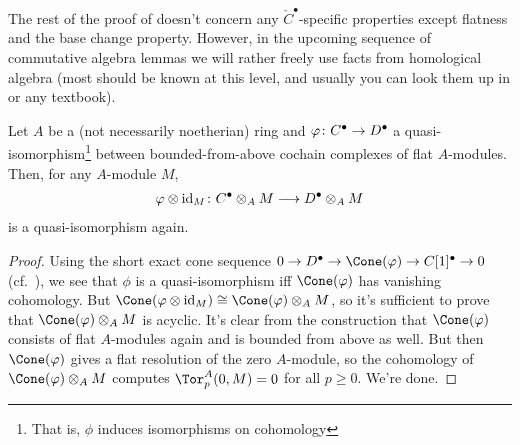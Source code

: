 \documentclass[a4paper,parskip=half,numbers=enddot, DIV=12]{scrreprt}
\renewcommand{\geq}{\geqslant}
\begin{document}
	The rest of the proof of  doesn't concern any $\check{C}^\bullet$-specific properties except flatness and the base change property. However, in the upcoming sequence of commutative algebra lemmas we will rather freely use facts from homological algebra (most should be known at this level, and usually you can look them up in \cite{homalg} or any textbook).
	\begin{lem}
		Let $A$ be a (not necessarily noetherian) ring and $\phi\colon C^\bullet\morphism D^\bullet$ a quasi-isomorphism\footnote{That is, $\phi$ induces isomorphisms on cohomology} between bounded-from-above cochain complexes of flat $A$-modules. Then, for any $A$-module $M$,
		\begin{align*}
			\phi\otimes\id_M\colon C^\bullet\otimes_AM\morphism D^\bullet\otimes_AM
		\end{align*}
		is a quasi-isomorphism again.
	\end{lem}
\begin{proof}
	Using the short exact cone sequence $0\morphism D^\bullet \morphism\Cone(\phi)\morphism C[1]^\bullet\morphism 0$ (cf.\ \cite[Definition~2.1.1]{alggeo2}), we see that $\phi$ is a quasi-isomorphism iff $\Cone(\phi)$ has vanishing cohomology. But $\Cone(\phi\otimes\id_M)\cong \Cone(\phi)\otimes_AM$, so it's sufficient to prove that $\Cone(\phi)\otimes_AM$ is acyclic. It's clear from the construction that $\Cone(\phi)$ consists of flat $A$-modules again and is bounded from above as well. But then $\Cone(\phi)$ gives a flat resolution of the zero $A$-module, so the cohomology of $\Cone(\phi)\otimes_AM$ computes $\Tor_p^A(0,M)=0$ for all $p\geq 0$. We're done.
\end{proof}
\end{document}
